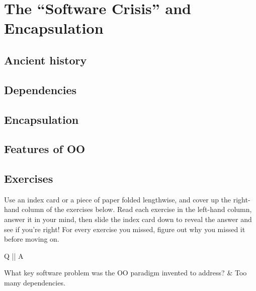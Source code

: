 
\chapter{The ``Software Crisis'' and Encapsulation}

\section{Ancient history}




\section{Dependencies}

\section{Encapsulation}

\section{Features of OO}

\section{Exercises}

Use an index card or a piece of paper folded lengthwise, and cover up the
right-hand column of the exercises below. Read each exercise in the
left-hand column, answer it in your mind, then slide the index card down to
reveal the answer and see if you're right! For every exercise you missed,
figure out why you missed it before moving on.

\begin{small}
\begin{enumerate}
\begin{longtable}{Q || A}
\hline
\item 
What key software problem was the OO paradigm invented to address?
&
Too many dependencies.
\\
\hline

\end{longtable}
\end{enumerate}
\end{small}
